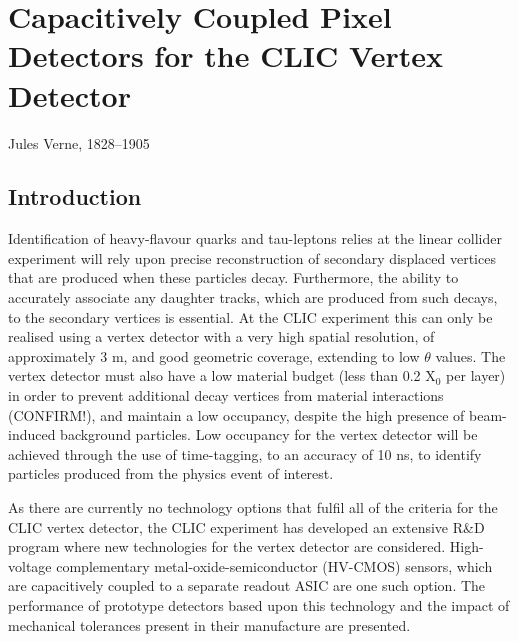 \chapter{Capacitively Coupled Pixel Detectors for the CLIC Vertex Detector}
\label{chap:theory}

{Jules Verne, 1828--1905}


\section{Introduction}



Identification of heavy-flavour quarks and tau-leptons relies at the linear collider experiment will rely upon precise reconstruction of secondary displaced vertices that are produced when these particles decay.  Furthermore, the ability to accurately associate any daughter tracks, which are produced from such decays, to the secondary vertices is essential.  At the CLIC experiment this can only be realised using a vertex detector with a very high spatial resolution, of approximately 3 {\mu}m, and good geometric coverage, extending to low $\theta$ values.  The vertex detector must also have a low material budget (less than 0.2 $\text{X}_{0}$ per layer) in order to prevent additional decay vertices from material interactions (CONFIRM!), and maintain a low occupancy, despite the high presence of beam-induced background particles.  Low occupancy for the vertex detector will be achieved through the use of time-tagging, to an accuracy of 10 ns, to identify particles produced from the physics event of interest.  

As there are currently no technology options that fulfil all of the criteria for the CLIC vertex detector, the CLIC experiment has developed an extensive R\&D program where new technologies for the vertex detector are considered.  High-voltage complementary metal-oxide-semiconductor (HV-CMOS) sensors, which are capacitively coupled to a separate readout ASIC are one such option. The performance of prototype detectors based upon this technology and the impact of mechanical tolerances present in their manufacture are presented.  


